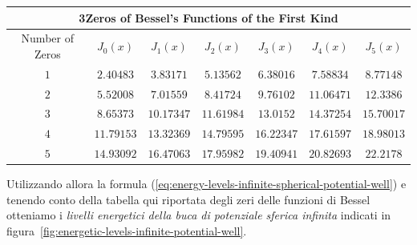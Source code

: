 \begin{table}[h]
	\begin{tabular}{|ccccccc|}
		\hline
		\multicolumn{7}{|c|}{3Zeros of Bessel’s Functions of the First Kind} \\ \hline
		\multicolumn{1}{|c|}{Number of Zeros} & \multicolumn{1}{c|}{$J_{0}(x)$} & \multicolumn{1}{c|}{$J_{1}(x)$} & \multicolumn{1}{c|}{$J_{2}(x)$} & \multicolumn{1}{c|}{$J_{3}(x)$} & \multicolumn{1}{c|}{$J_{4}(x)$} & $J_{5}(x)$ \\ \hline
		\multicolumn{1}{|c|}{$1$} & \multicolumn{1}{c|}{$2.40483$} & \multicolumn{1}{c|}{$3.83171$} & \multicolumn{1}{c|}{$5.13562$} & \multicolumn{1}{c|}{$6.38016$} & \multicolumn{1}{c|}{$7.58834$} & $8.77148$ \\ \hline
		\multicolumn{1}{|c|}{$2$} & \multicolumn{1}{c|}{$5.52008$} & \multicolumn{1}{c|}{$7.01559$} & \multicolumn{1}{c|}{$8.41724$} & \multicolumn{1}{c|}{$9.76102$} & \multicolumn{1}{c|}{$11.06471$} & $12.3386$ \\ \hline
		\multicolumn{1}{|c|}{$3$} & \multicolumn{1}{c|}{$8.65373$} & \multicolumn{1}{c|}{$10.17347$} & \multicolumn{1}{c|}{$11.61984$} & \multicolumn{1}{c|}{$13.0152$} & \multicolumn{1}{c|}{$14.37254$} & $15.70017$ \\ \hline
		\multicolumn{1}{|c|}{$4$} & \multicolumn{1}{c|}{$11.79153$} & \multicolumn{1}{c|}{$13.32369$} & \multicolumn{1}{c|}{$14.79595$} & \multicolumn{1}{c|}{$16.22347$} & \multicolumn{1}{c|}{$17.61597$} & $18.98013$ \\ \hline
		\multicolumn{1}{|c|}{$5$} & \multicolumn{1}{c|}{$14.93092$} & \multicolumn{1}{c|}{$16.47063$} & \multicolumn{1}{c|}{$17.95982$} & \multicolumn{1}{c|}{$19.40941$} & \multicolumn{1}{c|}{$20.82693$} & $22.2178$ \\ \hline
	\end{tabular}
\end{table}
Utilizzando allora la formula (\ref{eq:energy-levels-infinite-spherical-potential-well}) e tenendo conto della tabella
qui riportata degli zeri delle funzioni di Bessel otteniamo i
\emph{livelli energetici della buca di potenziale sferica infinita} indicati in figura~\ref{fig:energetic-levels-infinite-potential-well}.
